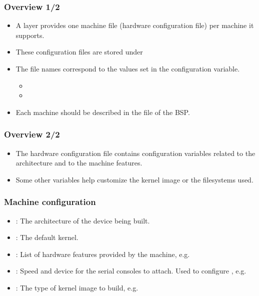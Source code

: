 \begin{frame}
  \frametitle{Overview 1/2}
  \begin{itemize}
    \item A layer provides one machine file (hardware configuration
      file) per machine it supports.
    \item These configuration files are stored under
    \item The file names correspond to the values set in the
       configuration variable.
      \begin{itemize}
        \item {}
        \item {}
      \end{itemize}
    \item Each machine should be described in the  file
      of the BSP.
  \end{itemize}
\end{frame}

\begin{frame}
  \frametitle{Overview 2/2}
  \begin{itemize}
    \item The hardware configuration file contains configuration
      variables related to the architecture and to the machine
      features.
    \item Some other variables help customize the kernel image or the
      filesystems used.
  \end{itemize}
\end{frame}

\begin{frame}
  \frametitle{Machine configuration}
  \begin{itemize}
    \item {}: The architecture of the device being built.
    \item {}: The default kernel.
    \item {}: List of hardware features provided by the
      machine, e.g. 
    \item {}: Speed and device for the serial consoles to
	    attach. Used to configure ,
      e.g. 
    \item {}: The type of kernel image to build, e.g.
  \end{itemize}
\end{frame}


